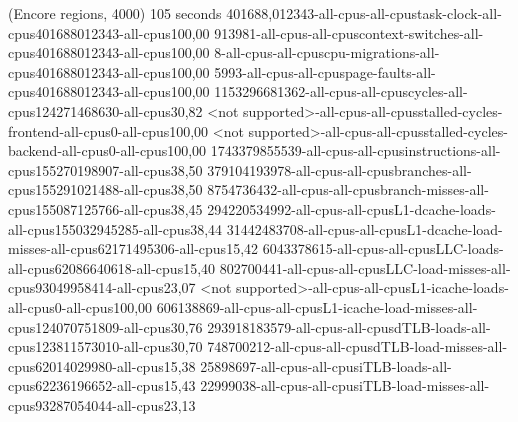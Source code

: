 (Encore regions, 4000)
105 seconds
401688,012343-all-cpus-all-cpustask-clock-all-cpus401688012343-all-cpus100,00
913981-all-cpus-all-cpuscontext-switches-all-cpus401688012343-all-cpus100,00
8-all-cpus-all-cpuscpu-migrations-all-cpus401688012343-all-cpus100,00
5993-all-cpus-all-cpuspage-faults-all-cpus401688012343-all-cpus100,00
1153296681362-all-cpus-all-cpuscycles-all-cpus124271468630-all-cpus30,82
<not supported>-all-cpus-all-cpusstalled-cycles-frontend-all-cpus0-all-cpus100,00
<not supported>-all-cpus-all-cpusstalled-cycles-backend-all-cpus0-all-cpus100,00
1743379855539-all-cpus-all-cpusinstructions-all-cpus155270198907-all-cpus38,50
379104193978-all-cpus-all-cpusbranches-all-cpus155291021488-all-cpus38,50
8754736432-all-cpus-all-cpusbranch-misses-all-cpus155087125766-all-cpus38,45
294220534992-all-cpus-all-cpusL1-dcache-loads-all-cpus155032945285-all-cpus38,44
31442483708-all-cpus-all-cpusL1-dcache-load-misses-all-cpus62171495306-all-cpus15,42
6043378615-all-cpus-all-cpusLLC-loads-all-cpus62086640618-all-cpus15,40
802700441-all-cpus-all-cpusLLC-load-misses-all-cpus93049958414-all-cpus23,07
<not supported>-all-cpus-all-cpusL1-icache-loads-all-cpus0-all-cpus100,00
606138869-all-cpus-all-cpusL1-icache-load-misses-all-cpus124070751809-all-cpus30,76
293918183579-all-cpus-all-cpusdTLB-loads-all-cpus123811573010-all-cpus30,70
748700212-all-cpus-all-cpusdTLB-load-misses-all-cpus62014029980-all-cpus15,38
25898697-all-cpus-all-cpusiTLB-loads-all-cpus62236196652-all-cpus15,43
22999038-all-cpus-all-cpusiTLB-load-misses-all-cpus93287054044-all-cpus23,13

